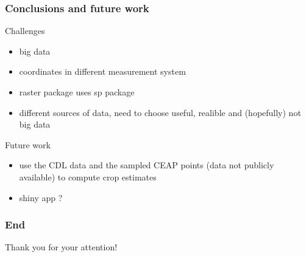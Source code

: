 \documentclass[xcolor=pdftex,dvipsnames,table]{beamer}
\begin{document}
\begin{frame}
\frametitle{Conclusions and future work}

Challenges
\begin{itemize}
\item big data 
\item coordinates in different measurement system
\item raster package uses sp package
\item different sources of data, need to choose useful, realible and (hopefully) not big data
\end{itemize}


Future work
\begin{itemize}
\item use the CDL data and the sampled CEAP points (data not publicly available) to compute crop estimates
\item shiny app ?
\end{itemize}

\end{frame}

\begin{frame}
\frametitle{End}

\large{Thank you for your attention!}\\

\end{frame}
\end{document}
